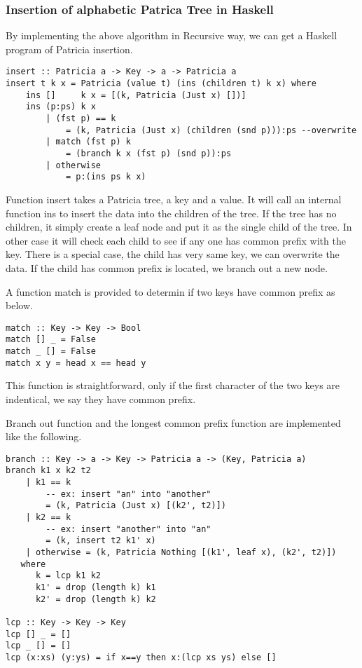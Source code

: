 \documentclass{article}
\begin{document}
\subsubsection*{Insertion of alphabetic Patrica Tree in Haskell}
By implementing the above algorithm in Recursive way, we can get a 
Haskell program of Patricia insertion.

\lstset{language=Haskell}
\begin{lstlisting}
insert :: Patricia a -> Key -> a -> Patricia a
insert t k x = Patricia (value t) (ins (children t) k x) where
    ins []     k x = [(k, Patricia (Just x) [])]
    ins (p:ps) k x 
        | (fst p) == k 
            = (k, Patricia (Just x) (children (snd p))):ps --overwrite
        | match (fst p) k 
            = (branch k x (fst p) (snd p)):ps
        | otherwise 
            = p:(ins ps k x)

\end{lstlisting}

Function insert takes a Patricia tree, a key and a value. It will call
an internal function ins to insert the data into the children of the tree.
If the tree has no children, it simply create a leaf node and put it
as the single child of the tree. In other case it will check each child
to see if any one has common prefix with the key. There is a special case,
the child has very same key, we can overwrite the data. If the child has common
prefix is located, we branch out a new node.

A function match is provided to determin if two keys have common prefix as 
below.

\begin{lstlisting}
match :: Key -> Key -> Bool
match [] _ = False
match _ [] = False
match x y = head x == head y
\end{lstlisting}

This function is straightforward, only if the first character of the two keys
are indentical, we say they have common prefix.

Branch out function and the longest common prefix function are implemented like
the following.

\begin{lstlisting}
branch :: Key -> a -> Key -> Patricia a -> (Key, Patricia a)
branch k1 x k2 t2 
    | k1 == k 
        -- ex: insert "an" into "another" 
        = (k, Patricia (Just x) [(k2', t2)])
    | k2 == k 
        -- ex: insert "another" into "an"
        = (k, insert t2 k1' x)
    | otherwise = (k, Patricia Nothing [(k1', leaf x), (k2', t2)]) 
   where
      k = lcp k1 k2
      k1' = drop (length k) k1
      k2' = drop (length k) k2

lcp :: Key -> Key -> Key
lcp [] _ = []
lcp _ [] = []
lcp (x:xs) (y:ys) = if x==y then x:(lcp xs ys) else []
\end{lstlisting}
\end{document}

